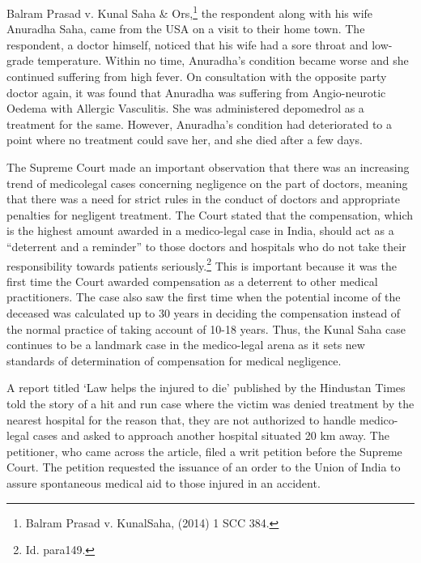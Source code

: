 \begin{multicols}{2}
\vspace{-.15cm}


\vspace{-.1cm}

\noi
Balram Prasad v. Kunal Saha \& Ors,\footnote{Balram Prasad v. KunalSaha, (2014) 1 SCC 384.} the respondent along with his wife Anuradha Saha, came
from the USA on a visit to their home town. The respondent, a doctor himself, noticed that his
wife had a sore throat and low-grade temperature. Within no time, Anuradha’s condition became
worse and she continued suffering from high fever. On consultation with the opposite party doctor
again, it was found that Anuradha was suffering from Angio-neurotic Oedema with Allergic
Vasculitis. She was administered depomedrol as a treatment for the same. However, Anuradha’s
condition had deteriorated to a point where no treatment could save her, and she died after a few
days.

\noi
The Supreme Court made an important observation that there was an increasing trend of medicolegal cases concerning negligence on the part of doctors, meaning that there was a need for strict
rules in the conduct of doctors and appropriate penalties for negligent treatment. The Court stated
that the compensation, which is the highest amount awarded in a medico-legal case in India,
should act as a “deterrent and a reminder” to those doctors and hospitals who do not take their responsibility towards patients seriously.\footnote{Id. para149.} This is important because it was the first time the Court
awarded compensation as a deterrent to other medical practitioners. The case also saw the first
time when the potential income of the deceased was calculated up to 30 years in deciding the
compensation instead of the normal practice of taking account of 10-18 years. Thus, the Kunal
Saha case continues to be a landmark case in the medico-legal arena as it sets new standards of
determination of compensation for medical negligence.


\noi
A report titled ‘Law helps the injured to die’ published by the Hindustan Times told the story of
a hit and run case where the victim was denied treatment by the nearest hospital for the reason
that, they are not authorized to handle medico-legal cases and asked to approach another hospital
situated 20 km away. The petitioner, who came across the article, filed a writ petition before the
Supreme Court. The petition requested the issuance of an order to the Union of India to assure
spontaneous medical aid to those injured in an accident.


\end{multicols}
